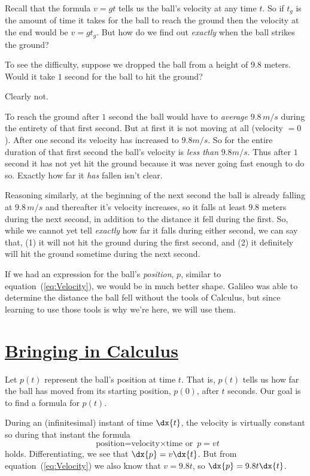 Recall that the formula $v=gt$  tells us the ball's velocity at any
time $t$. So if $t_g$ is the amount of time it takes for the ball to reach the
ground then  the velocity at the
end would be $v=gt_g$. But how do we find out \emph{exactly} when the ball strikes the ground?

To see the difficulty, suppose we dropped the ball from
a height of $9.8$ meters.  Would it take $1$ second for the ball to
hit the ground?

Clearly not.

To reach the ground after $1$ second the ball would have to
\emph{average} $9.8\,m/s$ during the entirety of that first second.
But at first it is not moving at all (velocity $=0$). After one second
its velocity has increased to $9.8 m/s$. So for the entire duration of
that first second the ball's velocity is \emph{less than} $9.8
m/s$. Thus after $1$ second it has not yet hit the ground because it
was never going fast enough to do so.  Exactly how far it \emph{has} fallen
isn't clear.

Reasoning similarly, at the beginning of the next second the ball is
already falling at $9.8\,m/s$ and thereafter it's velocity increases,
so it falls at least $9.8$ meters during the next second, in addition
to the distance it fell during the first. So, while we cannot yet tell
\emph{exactly} how far it falls during either second, we can say that,
(1) it will not hit the ground during the first  second, and (2)  it
definitely  will hit the ground sometime during 
the next second.


If we had an expression for the ball's \emph{position}, $p$, similar
to equation~(\ref{eq:Velocity}), we would be in much better shape.
Galileo was able to determine the distance the ball fell without the
tools of Calculus, but since learning to use those tools is why we're
here, we will use them.


\section*{\underline{Bringing in Calculus}}

Let $p(t)$ represent the ball's position at time $t.$ That is, $p(t)$
tells us how far the ball has moved from its starting position,
$p(0)$, after $t$ seconds.  Our goal is to find a formula for $p(t)$.

During an (infinitesimal) instant of time $\dx{t}$, the velocity is
virtually constant so during that instant the formula
$$
\text{ position=velocity$\times$time  or }  p=vt 
$$
holds. Differentiating, we see that
$
\dx{p}=v\dx{t}$.
But from equation~(\ref{eq:Velocity}) we also know that $v=9.8t$, so
$ \dx{p}=9.8t\dx{t}$.

